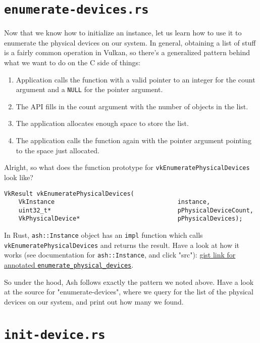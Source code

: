 \documentclass[12pt,letterpaper]{article}
\newcommand{\ril}[1]{\texttt{#1}}
\newcommand{\cil}[1]{\texttt{#1}}
\begin{document}
\section{\texttt{enumerate-devices.rs}}
	Now that we know how to initialize an instance, let us learn how to use it to enumerate the physical devices on our system. In general, obtaining a list of stuff is a fairly common operation in Vulkan, so there's a generalized pattern behind what we want to do on the C side of things:
		\begin{enumerate}
			\item Application calls the function with a valid pointer to an integer for the count argument and a \cil{NULL} for the pointer argument.
			
			\item The API fills in the count argument with the number of objects in the list.
			
			\item The application allocates enough space to store the list.
			
			\item The application calls the function again with the pointer argument pointing to the space just allocated.
		\end{enumerate}
	
	Alright, so what does the function prototype for \cil{vkEnumeratePhysicalDevices} look like?
	\begin{verbatim}
VkResult vkEnumeratePhysicalDevices(
	VkInstance                                  instance,
	uint32_t*                                   pPhysicalDeviceCount,
	VkPhysicalDevice*                           pPhysicalDevices);
	\end{verbatim}
	
	In Rust, \ril{ash::Instance} object has an \ril{impl} function which calls \cil{vkEnumeratePhysicalDevices} and returns the result. Have a look at how it works (see documentation for \ril{ash::Instance}, and click "src"): \href{https://gist.github.com/bzm3r/175cd2b63db8f783ed968df20462be67}{gist link for annotated \texttt{enumerate\_physical\_devices}}.
		
	So under the hood, Ash follows exactly the pattern we noted above. Have a look at the source for "enumerate-devices", where we query for the list of the physical devices on our system, and print out how many we found.
	
\section{\texttt{init-device.rs}}
	
\end{document}
